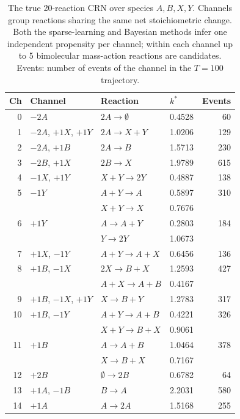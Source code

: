 \begin{table}[htbp]
\centering
\caption{%
  The true 20-reaction CRN over species $A,B,X,Y$.
  Channels group reactions sharing the same net stoichiometric change.
  Both the sparse-learning and Bayesian methods infer one independent
  propensity per channel; within each channel up to 5 bimolecular
  mass-action reactions are candidates.
  Events: number of events of the channel in the $T{=}100$ trajectory.
}
\label{tab:true-system}
\begin{tabular}{rlllr}
\toprule
Ch & Channel & Reaction & $k^*$ & Events \\
\midrule
0 & $-2A$ & $2A \to \emptyset$ & 0.4528 & 60 \\
1 & $-2A$, $+1X$, $+1Y$ & $2A \to X+Y$ & 1.0206 & 129 \\
2 & $-2A$, $+1B$ & $2A \to B$ & 1.5713 & 230 \\
3 & $-2B$, $+1X$ & $2B \to X$ & 1.9789 & 615 \\
4 & $-1X$, $+1Y$ & $X+Y \to 2Y$ & 0.4887 & 138 \\
5 & $-1Y$ & $A+Y \to A$ & 0.5897 & 310 \\
 &  & $X+Y \to X$ & 0.7676 &  \\
6 & $+1Y$ & $A \to A+Y$ & 0.2803 & 184 \\
 &  & $Y \to 2Y$ & 1.0673 &  \\
7 & $+1X$, $-1Y$ & $A+Y \to A+X$ & 0.6456 & 136 \\
8 & $+1B$, $-1X$ & $2X \to B+X$ & 1.2593 & 427 \\
 &  & $A+X \to A+B$ & 0.4167 &  \\
9 & $+1B$, $-1X$, $+1Y$ & $X \to B+Y$ & 1.2783 & 317 \\
10 & $+1B$, $-1Y$ & $A+Y \to A+B$ & 0.4221 & 326 \\
 &  & $X+Y \to B+X$ & 0.9061 &  \\
11 & $+1B$ & $A \to A+B$ & 1.0464 & 378 \\
 &  & $X \to B+X$ & 0.7167 &  \\
12 & $+2B$ & $\emptyset \to 2B$ & 0.6782 & 64 \\
13 & $+1A$, $-1B$ & $B \to A$ & 2.2031 & 580 \\
14 & $+1A$ & $A \to 2A$ & 1.5168 & 255 \\
\bottomrule
\end{tabular}
\end{table}